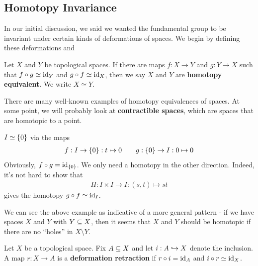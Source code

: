 
\subsection{Homotopy Invariance}

In our initial discussion, we said we wanted the fundamental group to be invariant under certain kinds of deformations of spaces. We begin by defining these deformations and 

\begin{boxdefinition} 
    Let $X$ and $Y$ be topological spaces. If there are maps $f : X \to Y$ and $g : Y \to X$ such that $f \circ g \simeq \operatorname{id}_Y$ and $g \circ f \simeq \operatorname{id}_X$, then we say $X$ and $Y$ are \textbf{homotopy equivalent}. We write $X \simeq Y$.
\end{boxdefinition}

There are many well-known examples of homotopy equivalences of spaces. At some point, we will probably look at \textbf{contractible spaces}, which are spaces that are homotopic to a point.

\begin{boxexample}
    $I \simeq \left\{ 0 \right\}$ via the maps
    \begin{align*}
        f : I \to \left\{ 0 \right\} : t \mapsto 0
        \qquad
        g : \left\{ 0 \right\} \to I : 0 \mapsto 0
    \end{align*}
    Obviously, $f \circ g = \operatorname{id}_{\left\{ 0 \right\}}$. We only need a homotopy in the other direction. Indeed, it's not hard to show that
    \begin{align*}
        H : I \times I \to I : (s, t) \mapsto st
    \end{align*}
    gives the homotopy $g \circ f \simeq \operatorname{id}_I$.
\end{boxexample}

We can see the above example as indicative of a more general pattern - if we have spaces $X$ and $Y$ with $Y\subseteq X$, then it seems that $X$ and $Y$ should be homotopic if there are no ``holes'' in $X\setminus Y$.

\begin{boxdefinition}
    Let $X$ be a topological space. Fix $A \subseteq X$ and let $i : A \hookrightarrow X$ denote the inclusion. A map $r : X \to A$ is a \textbf{deformation retraction} if $r \circ i = \operatorname{id}_A$ and $i \circ r \simeq \operatorname{id}_X$.
\end{boxdefinition}

